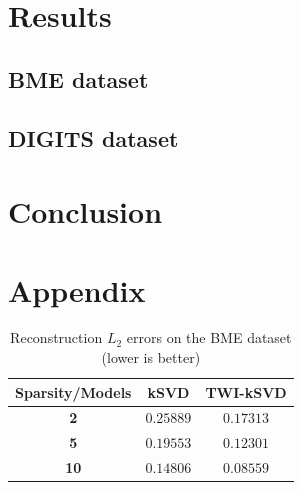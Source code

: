 \documentclass[10pt,twocolumn,letterpaper]{article}
\begin{document}
\section{Results}
\label{sec:results}

\subsection{BME dataset}

\paragraph{} 

\subsection{DIGITS dataset}

\paragraph{} 


\section{Conclusion}
\label{sec:conclusion}

\paragraph{} 

\section{Appendix}
\label{sec:appendix}

\begin{table}[ht]
    \centering
        \begin{tabular}{ccc}
            \toprule
            \textbf{Sparsity/Models} & \textbf{kSVD} & \textbf{TWI-kSVD} \\
            \midrule
            \textbf{2} & $0.25889$ & $0.17313$ \\
            \textbf{5} & $0.19553$ & $0.12301$ \\
            \textbf{10} & $0.14806$ & $\bm{0.08559}$ \\
            \bottomrule
        \end{tabular}
    \caption{Reconstruction $L_2$ errors on the BME dataset (lower is better)}
    \label{tab:reconstruction_results_BME}
\end{table}
\end{document}
